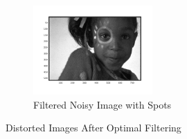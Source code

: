 \documentclass{article}
\begin{document}
\begin{figure}[h]
\begin{subfigure}{1.0\textwidth}
			\begin{center}
				\includegraphics[width=0.5\textwidth]{nosp.png}
				\caption{Filtered Noisy Image with Spots}
			\end{center}
		\end{subfigure}
		\caption{Distorted Images After Optimal Filtering}	
	\end{figure}
\end{document}
